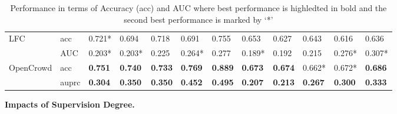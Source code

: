 \begin{table*}[!h]
\begin{tabular}{|l|l|l|l|l|l|l|l|l|l|l|l|}
\multirow{2}{*}{LFC}         & acc     & 0.721*         & 0.694          & 0.718          & 0.691          & 0.755          & 0.653          & 0.627          & 0.643          & 0.616          & 0.636          \\ \cline{2-12} 
                             & AUC   & 0.203*         & 0.203*         & 0.225          & 0.264*         & 0.277          & 0.189*         & 0.192          & 0.215          & 0.276*         & 0.307*         \\ \hline
\multirow{2}{*}{OpenCrowd}   & acc     & \textbf{0.751} & \textbf{0.740} & \textbf{0.733}         & \textbf{0.769} & \textbf{0.889}  & \textbf{0.673} & \textbf{0.674} & 0.662*         & 0.672*         & \textbf{0.686} \\ \cline{2-12} 
                             & auprc   & \textbf{0.304} & \textbf{0.350} & \textbf{0.350} & \textbf{0.452} & \textbf{0.495} & \textbf{0.207} & \textbf{0.213} & \textbf{0.267} & \textbf{0.300} & \textbf{0.333} \\ \hline
\end{tabular}
   \caption{Performance in terms of Accuracy (acc) and AUC where best performance is highledted in bold and the second best performance is marked by `*' }\label{tab:comparision} 
\end{table*}
\label{sec:compres}

\smallskip
\noindent\textbf{Impacts of Supervision Degree.}
